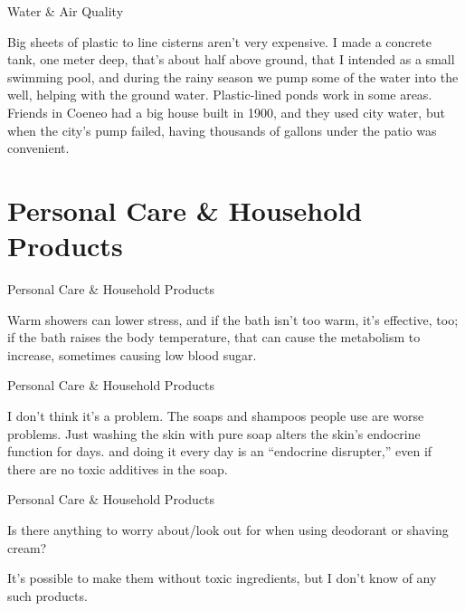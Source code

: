 \documentclass[11pt,oneside,openany,extrafontsizes]{memoir}
\begin{document}
\begin{standalonequote}{Water \& Air Quality}

    \begin{answer}
      Big sheets of plastic to line cisterns aren't very expensive. I made a concrete tank, one meter deep, that's about half above ground, that I intended as a small swimming pool, and during the rainy season we pump some of the water into the well, helping with the ground water. Plastic-lined ponds work in some areas. Friends in Coeneo had a big house built in 1900, and they used city water, but when the city's pump failed, having thousands of gallons under the patio was convenient.
    \end{answer}
\end{standalonequote}

\section{Personal Care \& Household Products}

\begin{standalonequote}{Personal Care \& Household Products}

    \begin{answer}
        Warm showers can lower stress, and if the bath isn't too warm, it's effective, too; if the bath raises the body temperature, that can cause the metabolism to increase, sometimes causing low blood sugar.
    \end{answer}
\end{standalonequote}

\begin{standalonequote}{Personal Care \& Household Products}

    \begin{answer}
        I don't think it's a problem. The soaps and shampoos people use are worse problems. Just washing the skin with pure soap alters the skin's endocrine function for days. and doing it every day is an \enquote{endocrine disrupter,} even if there are no toxic additives in the soap.
    \end{answer}
\end{standalonequote}

\begin{qaexchange}{Personal Care \& Household Products}

    \begin{question}
        Is there anything to worry about/look out for when using deodorant or shaving cream?
    \end{question}

    \begin{answer}
        It's possible to make them without toxic ingredients, but I don't know of any such products.
    \end{answer}
\end{qaexchange}
\end{document}
